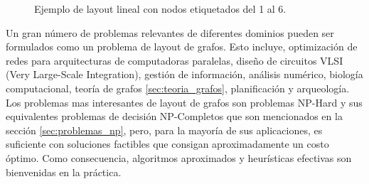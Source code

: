 \begin{figure}[h]
	\centering
	\caption{Ejemplo de layout lineal con nodos etiquetados del 1 al 6.}
	\label{fig:ejemplo_grafo_linear}
\end{figure}

Un gran número de problemas relevantes de diferentes dominios pueden ser formulados como un problema de layout de grafos. Esto incluye, optimización de redes para arquitecturas de computadoras paralelas, diseño de circuitos VLSI (Very Large-Scale Integration), gestión de información, análisis numérico, biología computacional, teoría de grafos \ref{sec:teoria_grafos}, planificación y arqueología. Los problemas mas interesantes de layout de grafos son problemas NP-Hard y sus equivalentes problemas de decisión NP-Completos que son mencionados en la sección \ref{sec:problemas_np}, pero, para la mayoría de sus aplicaciones, es suficiente con soluciones factibles que consigan aproximadamente un costo óptimo. Como consecuencia, algoritmos aproximados y heurísticas efectivas son bienvenidas en la práctica.


